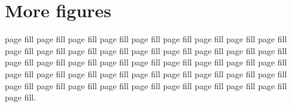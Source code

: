 
\section{More figures}


\noindent page fill page fill page fill page fill page fill page fill page fill page fill page fill page fill page fill page fill page fill page fill page fill page fill page fill page fill page fill page fill page fill page fill page fill page fill page fill page fill page fill page fill page fill page fill page fill page fill page fill page fill page fill page fill page fill page fill page fill page fill page fill page fill page fill page fill page fill page fill.